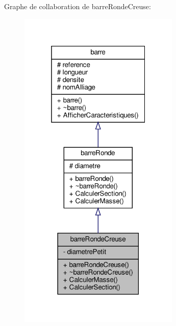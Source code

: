 Graphe de collaboration de barre\+Ronde\+Creuse\+:
\nopagebreak
\begin{figure}[H]
\begin{center}
\leavevmode
\includegraphics[width=217pt]{classbarre_ronde_creuse__coll__graph}
\end{center}
\end{figure}
